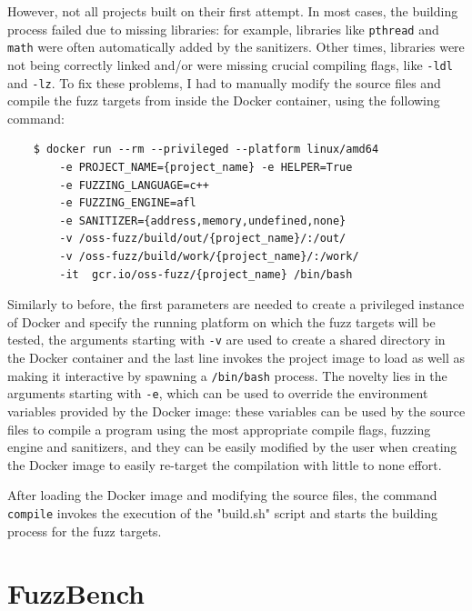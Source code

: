 \newpage
However, not all projects built on their first attempt.
In most cases, the building process failed due to missing libraries: for example, libraries like \verb|pthread| and \verb|math| were often automatically added by the sanitizers. Other times, libraries were not being correctly linked and/or were missing crucial compiling flags, like \verb|-ldl| and \verb|-lz|. To fix these problems, I had to manually modify the source files and compile the fuzz targets from inside the Docker container, using the following command:
\begin{verbatim}
    $ docker run --rm --privileged --platform linux/amd64 
        -e PROJECT_NAME={project_name} -e HELPER=True 
        -e FUZZING_LANGUAGE=c++ 
        -e FUZZING_ENGINE=afl 
        -e SANITIZER={address,memory,undefined,none} 
        -v /oss-fuzz/build/out/{project_name}/:/out/   
        -v /oss-fuzz/build/work/{project_name}/:/work/
        -it  gcr.io/oss-fuzz/{project_name} /bin/bash
\end{verbatim}
Similarly to before, the first parameters are needed to create a privileged instance of Docker and specify the running platform on which the fuzz targets will be tested, the arguments starting with \verb|-v| are used to create a shared directory in the Docker container and the last line invokes the project image to load as well as making it interactive by spawning a \verb|/bin/bash| process.
The novelty lies in the arguments starting with \verb|-e|, which can be used to override the environment variables provided by the Docker image: these variables can be used by the source files to compile a program using the most appropriate compile flags, fuzzing engine and sanitizers, and they can be easily modified by the user when creating the Docker image to easily re-target the compilation with little to none effort. 

After loading the Docker image and modifying the source files, the command \verb|compile| invokes the execution of the "build.sh" script and starts the building process for the fuzz targets.













\newpage
\section{FuzzBench}
